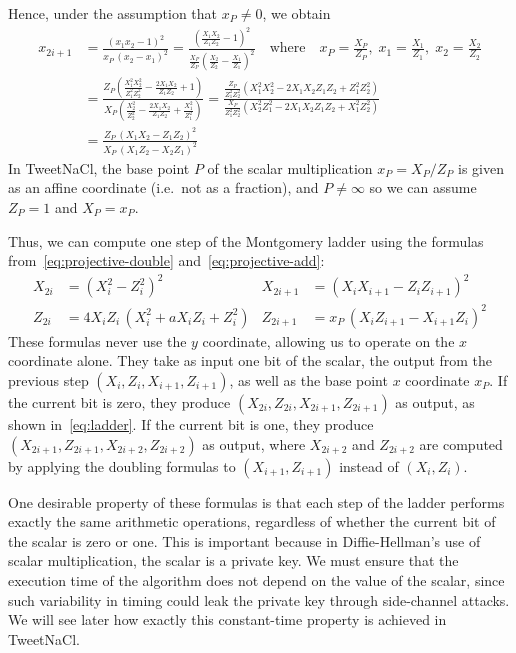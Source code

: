 \documentclass{article}
\begin{document}
Hence, under the assumption that $x_P \ne 0$, we obtain
\begin{align}
x_{2i+1} &= \frac{(x_1 x_2 - 1)^2}{x_P\,(x_2 - x_1)^2}
    = \frac{\left(\frac{X_1 X_2}{Z_1 Z_2} - 1\right)^2}{\frac{X_P}{Z_P} \left(\frac{X_2}{Z_2} - \frac{X_1}{Z_1}\right)^2}
    \quad\text{where}\quad x_P = \frac{X_P}{Z_P},\; x_1 = \frac{X_1}{Z_1},\; x_2 = \frac{X_2}{Z_2} \nonumber\\[5pt]
&= \frac{Z_P \left(\frac{X_1^2 X_2^2}{Z_1^2 Z_2^2} - \frac{2X_1 X_2}{Z_1 Z_2} + 1\right)}{X_P \left(\frac{X_2^2}{Z_2^2} - \frac{2X_1 X_2}{Z_1 Z_2} + \frac{X_1^2}{Z_1^2}\right)}
= \frac{\frac{Z_P}{Z_1^2 Z_2^2} \left(X_1^2 X_2^2 - 2X_1 X_2 Z_1 Z_2 + Z_1^2 Z_2^2\right)}{\frac{X_P}{Z_1^2 Z_2^2} \left(X_2^2 Z_1^2 - 2X_1 X_2 Z_1 Z_2 + X_1^2 Z_2^2\right)} \nonumber\\[5pt]
    &= \frac{Z_P\,(X_1 X_2 - Z_1 Z_2)^2}{X_P\,(X_1 Z_2 - X_2 Z_1)^2} \label{eq:projective-add}
\end{align}
In TweetNaCl, the base point $P$ of the scalar multiplication $x_P = X_P/Z_P$ is given as an affine coordinate (i.e.\ not as a fraction), and $P \ne \infty$ so we can assume $Z_P=1$ and $X_P=x_P$.

Thus, we can compute one step of the Montgomery ladder using the formulas from~\eqref{eq:projective-double} and~\eqref{eq:projective-add}:
\begin{align}
X_{2i} &= (X_i^2 - Z_i^2)^2 &
X_{2i+1} &= (X_i X_{i+1} - Z_i Z_{i+1})^2 \label{eq:ladder-step}\\
Z_{2i} &= 4X_i Z_i\,(X_i^2 + aX_i Z_i + Z_i^2) &
Z_{2i+1} &= x_P\,(X_i Z_{i+1} - X_{i+1} Z_i)^2 \nonumber
\end{align}
These formulas never use the $y$ coordinate, allowing us to operate on the $x$ coordinate alone.
They take as input one bit of the scalar, the output from the previous step $(X_i, Z_i, X_{i+1}, Z_{i+1})$, as well as the base point $x$ coordinate $x_P$.
If the current bit is zero, they produce $(X_{2i}, Z_{2i}, X_{2i+1}, Z_{2i+1})$ as output, as shown in~\eqref{eq:ladder}.
If the current bit is one, they produce $(X_{2i+1}, Z_{2i+1}, X_{2i+2}, Z_{2i+2})$ as output, where $X_{2i+2}$ and $Z_{2i+2}$ are computed by applying the doubling formulas to $(X_{i+1}, Z_{i+1})$ instead of $(X_i, Z_i)$.

One desirable property of these formulas is that each step of the ladder performs exactly the same arithmetic operations, regardless of whether the current bit of the scalar is zero or one.
This is important because in Diffie-Hellman's use of scalar multiplication, the scalar is a private key.
We must ensure that the execution time of the algorithm does not depend on the value of the scalar, since such variability in timing could leak the private key through side-channel attacks.
We will see later how exactly this constant-time property is achieved in TweetNaCl.
\end{document}
